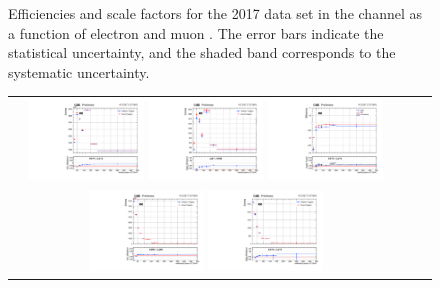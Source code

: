 \begin{figure}[!htb]
\begin{center}
\begin{tabular}{ccc}
    \end{tabular}
    \caption{Efficiencies and scale factors for the 2017 data set in the \emu channel as a function of electron and muon \pT.
            The error bars indicate the statistical uncertainty, and the shaded band corresponds to the systematic uncertainty.
            }
    \label{TrigSF_2017_1}
  \end{center}
\end{figure}

\begin{figure}[!htb]
  \begin{center}
    \begin{tabular}{ccc}
      \includegraphics[width=0.30\textwidth]{fig_2017_TrigSF/g_lepApt_ee_MC.pdf}
      \includegraphics[width=0.30\textwidth]{fig_2017_TrigSF/g_lepApt_ee_data.pdf}
      \includegraphics[width=0.30\textwidth]{fig_2017_TrigSF/g_ee_lepApt_FullSystUncBand.pdf}\\
      \includegraphics[width=0.30\textwidth]{fig_2017_TrigSF/g_lepBpt_ee_MC.pdf}
      \includegraphics[width=0.30\textwidth]{fig_2017_TrigSF/g_lepBpt_ee_data.pdf}

\end{tabular}
\end{center}
\end{figure}
